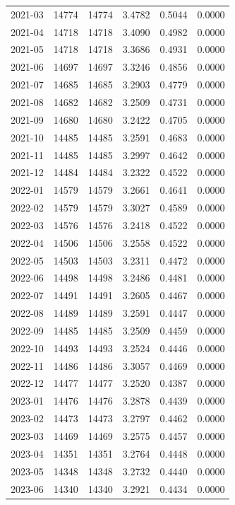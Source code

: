 \begin{tabular}{lrrrrr}
2021-03 & 14774 & 14774 & 3.4782 & 0.5044 & 0.0000 \\
2021-04 & 14718 & 14718 & 3.4090 & 0.4982 & 0.0000 \\
2021-05 & 14718 & 14718 & 3.3686 & 0.4931 & 0.0000 \\
2021-06 & 14697 & 14697 & 3.3246 & 0.4856 & 0.0000 \\
2021-07 & 14685 & 14685 & 3.2903 & 0.4779 & 0.0000 \\
2021-08 & 14682 & 14682 & 3.2509 & 0.4731 & 0.0000 \\
2021-09 & 14680 & 14680 & 3.2422 & 0.4705 & 0.0000 \\
2021-10 & 14485 & 14485 & 3.2591 & 0.4683 & 0.0000 \\
2021-11 & 14485 & 14485 & 3.2997 & 0.4642 & 0.0000 \\
2021-12 & 14484 & 14484 & 3.2322 & 0.4522 & 0.0000 \\
2022-01 & 14579 & 14579 & 3.2661 & 0.4641 & 0.0000 \\
2022-02 & 14579 & 14579 & 3.3027 & 0.4589 & 0.0000 \\
2022-03 & 14576 & 14576 & 3.2418 & 0.4522 & 0.0000 \\
2022-04 & 14506 & 14506 & 3.2558 & 0.4522 & 0.0000 \\
2022-05 & 14503 & 14503 & 3.2311 & 0.4472 & 0.0000 \\
2022-06 & 14498 & 14498 & 3.2486 & 0.4481 & 0.0000 \\
2022-07 & 14491 & 14491 & 3.2605 & 0.4467 & 0.0000 \\
2022-08 & 14489 & 14489 & 3.2591 & 0.4447 & 0.0000 \\
2022-09 & 14485 & 14485 & 3.2509 & 0.4459 & 0.0000 \\
2022-10 & 14493 & 14493 & 3.2524 & 0.4446 & 0.0000 \\
2022-11 & 14486 & 14486 & 3.3057 & 0.4469 & 0.0000 \\
2022-12 & 14477 & 14477 & 3.2520 & 0.4387 & 0.0000 \\
2023-01 & 14476 & 14476 & 3.2878 & 0.4439 & 0.0000 \\
2023-02 & 14473 & 14473 & 3.2797 & 0.4462 & 0.0000 \\
2023-03 & 14469 & 14469 & 3.2575 & 0.4457 & 0.0000 \\
2023-04 & 14351 & 14351 & 3.2764 & 0.4448 & 0.0000 \\
2023-05 & 14348 & 14348 & 3.2732 & 0.4440 & 0.0000 \\
2023-06 & 14340 & 14340 & 3.2921 & 0.4434 & 0.0000 \\

\end{tabular}
